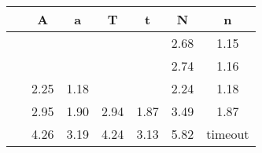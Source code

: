 \begin{table}[htb]   
    \renewcommand{\arraystretch}{1.2}
    \centering
\begin{tabular}{|c|c|c|c|c|c|c |}
    \hline
     &\;\;A\;\;&\;\;a\;\;&\;\;T\;\;&\;\;t\;\;&\;\; N\;\;&\;\;n\;\; \\
    \hline
   ~\cite[Example 6.2]{endrullis2024generalized_arxiv_v2} & & & & & 2.68 &1.15   \\
   ~\cite[Example 6.3]{endrullis2024generalized_arxiv_v2} & & & & & 2.74 &1.16   \\
   ~\cite[Example D.3]{endrullis2024generalized_arxiv_v2} &2.25 
    & 1.18
    & & & 2.24& 1.18    \\
   ~\cite[Example 3.8]{plump1995ontermination}
 & 2.95& 1.90 & 2.94 &1.87  & 3.49  &1.87   \\
   ~\cite[Example 4]{plump2018modular} &4.26& 3.19&  4.24 & 3.13 &
    5.82
    & timeout  \\


\end{tabular}
\end{table}
